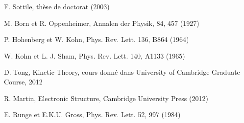 \documentclass[12pt, french]{report}
\theoremstyle{theoreme}
\begin{document}
\begin{thebibliography}{9}

    F. Sottile, thèse de doctorat (2003)

	M. Born et R. Oppenheimer, Annalen der Physik, 84, 457 (1927)

    P. Hohenberg et W. Kohn, Phys. Rev. Lett. 136, B864 (1964)

    W. Kohn et L. J. Sham, Phys. Rev. Lett. 140, A1133 (1965)

    D. Tong, Kinetic Theory, cours donné dans University of Cambridge Graduate Course, 2012
    
	R. Martin, Electronic Structure, Cambridge University Press (2012)
	
	E. Runge et E.K.U. Gross, Phys. Rev. Lett. 52, 997 (1984)

\end{thebibliography}
\end{document}
